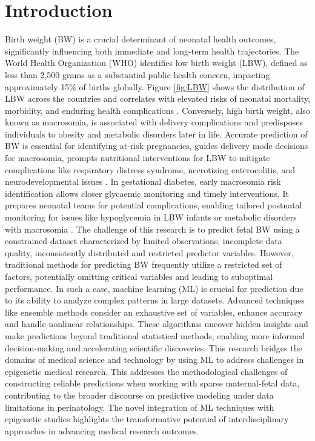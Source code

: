 \documentclass[12pt]{article}
\begin{document}
\section{Introduction}
Birth weight (BW) is a crucial determinant of neonatal health outcomes, significantly influencing both immediate and long-term health trajectories. The World Health Organization (WHO) identifies low birth weight (LBW), defined as less than 2,500 grams as a substantial public health concern, impacting approximately 15\% of births globally. Figure \ref{fig:LBW} shows the distribution of LBW across the countries and correlates with elevated risks of neonatal mortality, morbidity, and enduring health complications \cite{1A, 2A}.
Conversely, high birth weight, also known as macrosomia, is associated with delivery complications and predisposes individuals to obesity and metabolic disorders later in life. Accurate prediction of BW is essential for identifying at-risk pregnancies, guides delivery mode decisions for macrosomia, prompts nutritional interventions for LBW to mitigate complications like respiratory distress syndrome, necrotizing enterocolitis, and neurodevelopmental issues \cite{3A}. In gestational diabetes, early macrosomia risk identification allows closer glycaemic monitoring and timely interventions. It prepares neonatal teams for potential complications, enabling tailored postnatal monitoring for issues like hypoglycemia in LBW infants or metabolic disorders with macrosomia \cite{4A}. 
The challenge of this research is to predict fetal BW using a constrained dataset characterized by limited observations, incomplete data quality, inconsistently distributed and restricted predictor variables. However, traditional methods for predicting BW frequently utilize a restricted set of factors, potentially omitting critical variables and leading to suboptimal performance. In such a case, machine learning (ML) is crucial for prediction due to its ability to analyze complex patterns in large datasets. Advanced techniques like ensemble methods consider an exhaustive set of variables, enhance accuracy and handle nonlinear relationships. These algorithms uncover hidden insights and make predictions beyond traditional statistical methods, enabling more informed decision-making and accelerating scientific discoveries. This research bridges the domains of medical science and technology by using ML to address challenges in epigenetic medical research. This addresses the methodological challenges of constructing reliable predictions when working with sparse maternal-fetal data, contributing to the broader discourse on predictive modeling under data limitations in perinatology. The novel integration of ML techniques with epigenetic studies highlights the transformative potential of interdisciplinary approaches in advancing medical research outcomes.
\end{document}
